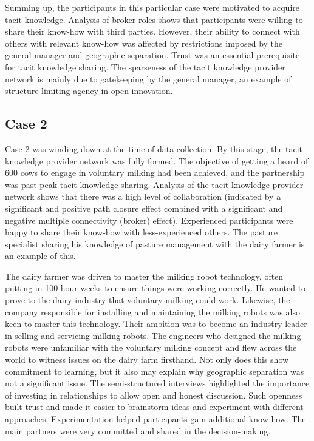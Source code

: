 Summing up, the participants in this particular case were motivated to acquire tacit knowledge. Analysis of broker roles shows that participants were willing to share their know-how with third parties. However, their ability to connect with others with relevant know-how was affected by restrictions imposed by the general manager and geographic separation. Trust was an essential prerequisite for tacit knowledge sharing. The sparseness of the tacit knowledge provider network is mainly due to gatekeeping by the general manager, an example of structure limiting agency in open innovation.

\subsection{Case 2}

Case 2 was winding down at the time of data collection. By this stage, the tacit knowledge provider network was fully formed. The objective of getting a heard of 600 cows to engage in voluntary milking had been achieved, and the partnership was past peak tacit knowledge sharing. Analysis of the tacit knowledge provider network shows that there was a high level of collaboration (indicated by a significant and positive path closure effect combined with a significant and negative multiple connectivity (broker) effect). Experienced participants were happy to share their know-how with less-experienced others. The pasture specialist sharing his knowledge of pasture management with the dairy farmer is an example of this. \medskip

The dairy farmer was driven to master the milking robot technology, often putting in 100 hour weeks to ensure things were working correctly. He wanted to prove to the dairy industry that voluntary milking could work. Likewise, the company responsible for installing and maintaining the milking robots was also keen to master this technology. Their ambition was to become an industry leader in selling and servicing milking robots. The engineers who designed the milking robots were unfamiliar with the voluntary milking concept and flew across the world to witness issues on the dairy farm firsthand. Not only does this show commitment to learning, but it also may explain why geographic separation was not a significant issue. The semi-structured interviews highlighted the importance of investing in relationships to allow open and honest discussion. Such openness built trust and made it easier to brainstorm ideas and experiment with different approaches. Experimentation helped participants gain additional know-how. The main partners were very committed and shared in the decision-making. \medskip

